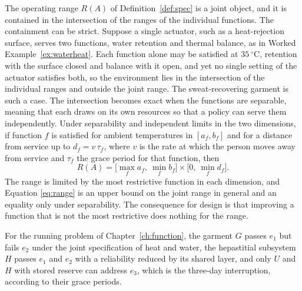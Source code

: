 \documentclass[11pt,openany]{book}
\theoremstyle{definition}
\theoremstyle{remark}
\begin{document}
The operating range $R(A)$ of Definition~\ref{def:spec} is a joint object, and it is contained in the intersection of the ranges of the individual functions. The containment can be strict. Suppose a single actuator, such as a heat-rejection surface, serves two functions, water retention and thermal balance, as in Worked Example~\ref{ex:waterheat}. Each function alone may be satisfied at $35\ ^\circ\mathrm{C}$, retention with the surface closed and balance with it open, and yet no single setting of the actuator satisfies both, so the environment lies in the intersection of the individual ranges and outside the joint range. The sweat-recovering garment is such a case. The intersection becomes exact when the functions are separable, meaning that each draws on its own resources so that a policy can serve them independently. Under separability and independent limits in the two dimensions, if function $f$ is satisfied for ambient temperatures in $[a_f,b_f]$ and for a distance from service up to $d_f=v\,\tau_f$, where $v$ is the rate at which the person moves away from service and $\tau_f$ the grace period for that function, then
\begin{equation}
R(A)=\Big[\max_f a_f,\ \min_f b_f\Big]\times\Big[0,\ \min_f d_f\Big].
\label{eq:range}
\end{equation}
The range is limited by the most restrictive function in each dimension, and Equation \eqref{eq:range} is an upper bound on the joint range in general and an equality only under separability. The consequence for design is that improving a function that is not the most restrictive does nothing for the range.

For the running problem of Chapter~\ref{ch:function}, the garment $G$ passes $e_1$ but fails $e_2$ under the joint specification of heat and water, the hepastitial subsystem $H$ passes $e_1$ and $e_2$ with a reliability reduced by its shared layer, and only $U$ and $H$ with stored reserve can address $e_3$, which is the three-day interruption, according to their grace periods.
\end{document}
